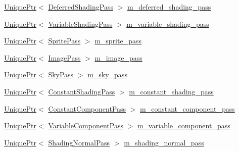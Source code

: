 \begin{DoxyCompactItemize}
\hyperlink{namespacemage_a3316d7143a973e37adf1110f2e80ca31}{Unique\+Ptr}$<$ \hyperlink{classmage_1_1_deferred_shading_pass}{Deferred\+Shading\+Pass} $>$ \hyperlink{classmage_1_1_scene_renderer_a05aa800b776f98b8b11e2d38a25c07e5}{m\+\_\+deferred\+\_\+shading\+\_\+pass}
\item 
\hyperlink{namespacemage_a3316d7143a973e37adf1110f2e80ca31}{Unique\+Ptr}$<$ \hyperlink{classmage_1_1_variable_shading_pass}{Variable\+Shading\+Pass} $>$ \hyperlink{classmage_1_1_scene_renderer_a9ee6d267f8cfb7826c16acd4fe0b7852}{m\+\_\+variable\+\_\+shading\+\_\+pass}
\item 
\hyperlink{namespacemage_a3316d7143a973e37adf1110f2e80ca31}{Unique\+Ptr}$<$ \hyperlink{classmage_1_1_sprite_pass}{Sprite\+Pass} $>$ \hyperlink{classmage_1_1_scene_renderer_a39d0db7aa9275362cd460339143a089b}{m\+\_\+sprite\+\_\+pass}
\item 
\hyperlink{namespacemage_a3316d7143a973e37adf1110f2e80ca31}{Unique\+Ptr}$<$ \hyperlink{classmage_1_1_image_pass}{Image\+Pass} $>$ \hyperlink{classmage_1_1_scene_renderer_aa2f25907375465f0b4693363bc5b7ab5}{m\+\_\+image\+\_\+pass}
\item 
\hyperlink{namespacemage_a3316d7143a973e37adf1110f2e80ca31}{Unique\+Ptr}$<$ \hyperlink{classmage_1_1_sky_pass}{Sky\+Pass} $>$ \hyperlink{classmage_1_1_scene_renderer_ab41b737ea054ad6a3c3f29e61d8a2ae7}{m\+\_\+sky\+\_\+pass}
\item 
\hyperlink{namespacemage_a3316d7143a973e37adf1110f2e80ca31}{Unique\+Ptr}$<$ \hyperlink{classmage_1_1_constant_shading_pass}{Constant\+Shading\+Pass} $>$ \hyperlink{classmage_1_1_scene_renderer_a2e98538d6add0603a2da5b949aa26953}{m\+\_\+constant\+\_\+shading\+\_\+pass}
\item 
\hyperlink{namespacemage_a3316d7143a973e37adf1110f2e80ca31}{Unique\+Ptr}$<$ \hyperlink{classmage_1_1_constant_component_pass}{Constant\+Component\+Pass} $>$ \hyperlink{classmage_1_1_scene_renderer_a34006a25d67bbe2aa4f25a61dee8cd2f}{m\+\_\+constant\+\_\+component\+\_\+pass}
\item 
\hyperlink{namespacemage_a3316d7143a973e37adf1110f2e80ca31}{Unique\+Ptr}$<$ \hyperlink{classmage_1_1_variable_component_pass}{Variable\+Component\+Pass} $>$ \hyperlink{classmage_1_1_scene_renderer_af3544515e1792eb3b1c1e511b1bccf46}{m\+\_\+variable\+\_\+component\+\_\+pass}
\item 
\hyperlink{namespacemage_a3316d7143a973e37adf1110f2e80ca31}{Unique\+Ptr}$<$ \hyperlink{classmage_1_1_shading_normal_pass}{Shading\+Normal\+Pass} $>$ \hyperlink{classmage_1_1_scene_renderer_a183c95ded274991bc80dccd8a373cce5}{m\+\_\+shading\+\_\+normal\+\_\+pass}

\end{DoxyCompactItemize}
